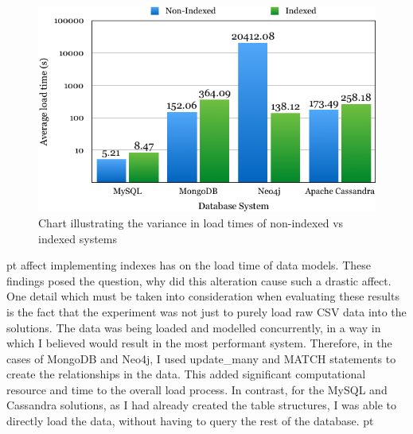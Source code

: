 \begin{figure}[H]\begin{center}\includegraphics[width=1\linewidth]{images/nonvsin}\caption{Chart illustrating the variance in load times of non-indexed vs indexed systems}\label{fig:nonvsin}\end{center}\end{figure}
 pt
affect implementing indexes has on the load time of data models. These findings posed the question, why did this alteration cause such a drastic affect. One detail which must be taken into consideration when evaluating these results is the fact that the experiment was not just to purely load raw CSV data into the solutions. The data was being loaded and modelled concurrently, in a way in which I believed would result in the most performant system. Therefore, in the cases of MongoDB and Neo4j, I used update\_many and MATCH statements to create the relationships in the data. This added significant computational resource and time to the overall load process. In contrast, for the MySQL and Cassandra solutions, as I had already created the table structures, I was able to directly load the data, without having to query the rest of the database. pt

